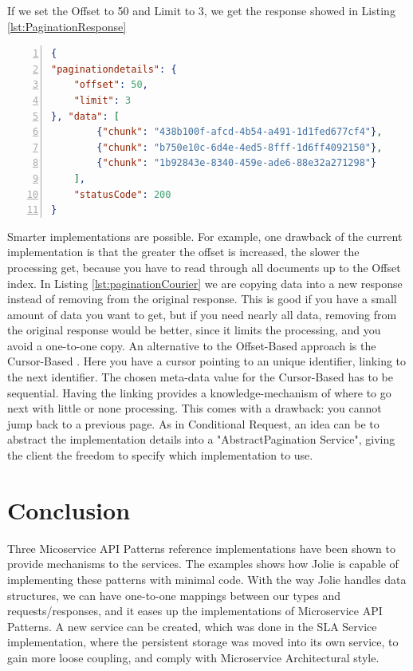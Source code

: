 \documentclass[12pt]{article}
\begin{document}
If we set the Offset to 50 and Limit to 3, we get the response showed in Listing \ref{lst:PaginationResponse}

\begin{lstlisting}[caption=The response to the client based on Offset and Limit meta-data, 
    captionpos=b, language=json, label={lst:PaginationResponse}, numbers=left]
{
"paginationdetails": {
    "offset": 50,
    "limit": 3
}, "data": [
        {"chunk": "438b100f-afcd-4b54-a491-1d1fed677cf4"},
        {"chunk": "b750e10c-6d4e-4ed5-8fff-1d6ff4092150"},
        {"chunk": "1b92843e-8340-459e-ade6-88e32a271298"}
    ],
    "statusCode": 200
}
\end{lstlisting}

Smarter implementations are possible. For example, one drawback of the current implementation is that the greater the offset is increased, the slower the processing get, because you have to read through all documents up to the Offset index. In Listing \ref{lst:paginationCourier} we are copying data into a new response instead of removing from the original response. This is good if you have a small amount of data you want to get, but if you need nearly all data, removing from the original response would be better, since it limits the processing, and you avoid a one-to-one copy. An alternative to the Offset-Based approach is the Cursor-Based \cite{CursorBased}. Here you have a cursor pointing to an unique identifier, linking to the next identifier. The chosen meta-data value for the Cursor-Based has to be sequential. Having the linking provides a knowledge-mechanism of where to go next with little or none processing. This comes with a drawback: you cannot jump back to a previous page. As in Conditional Request, an idea can be to abstract the implementation details into a "AbstractPagination Service", giving the client the freedom to specify which implementation to use. 

\section{Conclusion}

Three Micoservice API Patterns \cite{MAPIPweb} reference implementations have been shown to provide mechanisms to the services. The examples shows how Jolie is capable of implementing these patterns with minimal code. With the way Jolie handles data structures, we can have one-to-one mappings between our types and requests/responses, and it eases up the implementations of Microservice API Patterns. A new service can be created, which was done in the SLA Service implementation, where the persistent storage was moved into its own service, to gain more loose coupling, and comply with Microservice Architectural style.

\newpage


\end{document}
